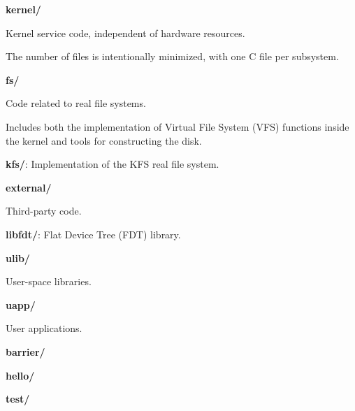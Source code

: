 \begin{DoxyItemize}
\begin{DoxyItemize}
\end{DoxyItemize}
\item {\bfseries kernel/}\par
 Kernel service code, independent of hardware resources.\par
 The number of files is intentionally minimized, with one C file per subsystem.
\item {\bfseries fs/}\par
 Code related to real file systems.\par
 Includes both the implementation of Virtual File System (V\-F\-S) functions inside the kernel and tools for constructing the disk.
\begin{DoxyItemize}
\item {\bfseries kfs/}\-: Implementation of the K\-F\-S real file system.
\end{DoxyItemize}
\item {\bfseries external/}\par
 Third-\/party code.
\begin{DoxyItemize}
\item {\bfseries libfdt/}\-: Flat Device Tree (F\-D\-T) library.
\end{DoxyItemize}
\item {\bfseries ulib/}\par
 User-\/space libraries.
\item {\bfseries uapp/}\par
 User applications.
\begin{DoxyItemize}
\item {\bfseries barrier/}
\item {\bfseries hello/}
\item {\bfseries test/} 
\end{DoxyItemize}
\end{DoxyItemize}